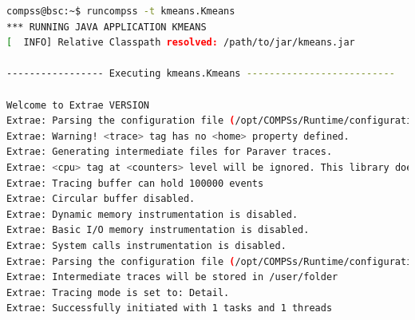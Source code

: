 \begin{lstlisting}[language=bash]
compss@bsc:~$ runcompss -t kmeans.Kmeans
*** RUNNING JAVA APPLICATION KMEANS
[  INFO] Relative Classpath resolved: /path/to/jar/kmeans.jar

----------------- Executing kmeans.Kmeans --------------------------

Welcome to Extrae VERSION
Extrae: Parsing the configuration file (/opt/COMPSs/Runtime/configuration/xml/tracing/extrae_basic.xml) begins
Extrae: Warning! <trace> tag has no <home> property defined.
Extrae: Generating intermediate files for Paraver traces.
Extrae: <cpu> tag at <counters> level will be ignored. This library does not support CPU HW.
Extrae: Tracing buffer can hold 100000 events
Extrae: Circular buffer disabled.
Extrae: Dynamic memory instrumentation is disabled.
Extrae: Basic I/O memory instrumentation is disabled.
Extrae: System calls instrumentation is disabled.
Extrae: Parsing the configuration file (/opt/COMPSs/Runtime/configuration/xml/tracing/extrae_basic.xml) has ended
Extrae: Intermediate traces will be stored in /user/folder
Extrae: Tracing mode is set to: Detail.
Extrae: Successfully initiated with 1 tasks and 1 threads


\end{lstlisting}
